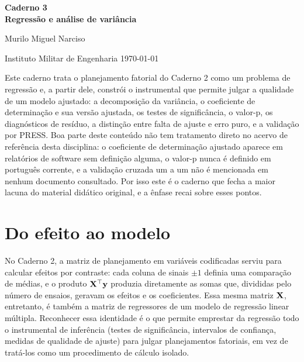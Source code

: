\documentclass{doeapostila}
\begin{document}
\begin{center}
  {\large\bfseries Caderno 3\\Regressão e análise de variância}\par\smallskip
  {\normalsize Murilo Miguel Narciso}\par\smallskip
  {\footnotesize Instituto Militar de Engenharia \textbullet{} \today}
\end{center}

\vspace{0.6\baselineskip}

\noindent
Este caderno trata o planejamento fatorial do Caderno 2 como um problema de
regressão e, a partir dele, constrói o instrumental que permite julgar a
qualidade de um modelo ajustado: a decomposição da variância, o coeficiente
de determinação e sua versão ajustada, os testes de significância, o
valor-p, os diagnósticos de resíduo, a distinção entre falta de ajuste e
erro puro, e a validação por PRESS. Boa parte deste conteúdo não tem
tratamento direto no acervo de referência desta disciplina: o coeficiente de
determinação ajustado aparece em relatórios de software sem definição
alguma, o valor-p nunca é definido em português corrente, e a validação
cruzada um a um não é mencionada em nenhum documento consultado. Por isso
este é o caderno que fecha a maior lacuna do material didático original, e a
ênfase recai sobre esses pontos.

\vspace{0.6\baselineskip}

\tableofcontents

\section{Do efeito ao modelo}

No Caderno 2, a matriz de planejamento em variáveis codificadas serviu para
calcular efeitos por contraste: cada coluna de sinais $\pm 1$ definia uma
comparação de médias, e o produto $\mathbf{X}^{\top}\mathbf{y}$ produzia diretamente
as somas que, divididas pelo número de ensaios, geravam os efeitos e os
coeficientes. Essa mesma matriz $\mathbf{X}$, entretanto, é também a matriz de
regressores de um modelo de regressão linear múltipla. Reconhecer essa
identidade é o que permite emprestar da regressão todo o instrumental de
inferência (testes de significância, intervalos de confiança, medidas de
qualidade de ajuste) para julgar planejamentos fatoriais, em vez de tratá-los
como um procedimento de cálculo isolado.
\end{document}
